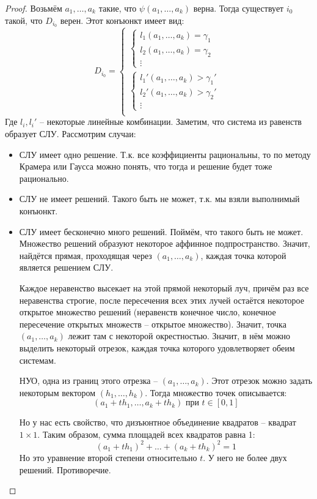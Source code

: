 \begin{proof}
    Возьмём $a_1, \dots, a_k$ такие, что $\psi(a_1, \dots, a_k)$ верна. Тогда существует $i_0$ такой, что $D_{i_0}$ верен. Этот конъюнкт имеет вид:
    $$ D_{i_0} = \begin{cases}
        \begin{cases}
            l_1(a_1, \dots, a_k) = \gamma_1 \\
            l_2(a_1, \dots, a_k) = \gamma_2 \\
            \vdots
        \end{cases} \\
        \begin{cases}
            l_1'(a_1, \dots, a_k) > \gamma_1' \\
            l_2'(a_1, \dots, a_k) > \gamma_2' \\
            \vdots
        \end{cases} \\
    \end{cases} $$
    Где $l_i, l_i'$ -- некоторые линейные комбинации.
    Заметим, что система из равенств образует СЛУ. Рассмотрим случаи:
    \begin{itemize}
        \item СЛУ имеет одно решение. Т.к. все коэффициенты рациональны, то по методу Крамера или Гаусса можно понять, что тогда и решение будет тоже рационально.
        \item СЛУ не имеет решений. Такого быть не может, т.к. мы взяли выполнимый конъюнкт.
        \item СЛУ имеет бесконечно много решений. Поймём, что такого быть не может. Множество решений образуют некоторое аффинное подпространство. Значит, найдётся прямая, проходящая через $(a_1, \dots, a_k)$, каждая точка которой является решением СЛУ.
        
        Каждое неравенство высекает на этой прямой некоторый луч, причём раз все неравенства строгие, после пересечения всех этих лучей остаётся некоторое открытое множество решений (неравенств конечное число, конечное пересечение открытых множеств -- открытое множество). Значит, точка $(a_1, \dots, a_k)$ лежит там с некоторой окрестностью. Значит, в нём можно выделить некоторый отрезок, каждая точка которого удовлетворяет обеим системам.

        НУО, одна из границ этого отрезка -- $(a_1, \dots, a_k)$. Этот отрезок можно задать некоторым вектором $(h_1, \dots, h_k)$. Тогда множество точек описывается:
        $$ (a_1 + t h_1, \dots, a_k + t h_k) \text{ при } t \in [0, 1] $$

        Но у нас есть свойство, что дизъюнтное объединение квадратов -- квадрат $1 \times 1$. Таким образом, сумма площадей всех квадратов равна 1:
        $$(a_1 + t h_1)^2 + \dots + (a_k + t h_k)^2 = 1$$
        Но это уравнение второй степени относительно $t$. У него не более двух решений. Противоречие.
    \end{itemize}
\end{proof}

